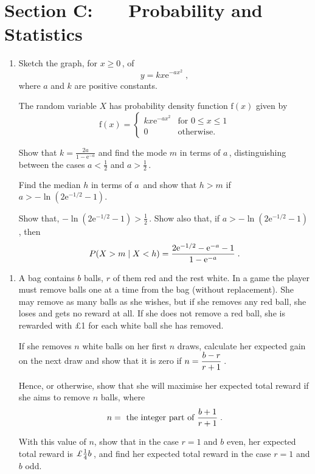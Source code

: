 \documentclass[a4, 11pt]{report}
\newlength{\qspace}
\newcounter{qnumber}
\newenvironment{question}%
 {\vspace{\qspace}
  \begin{enumerate}[\bfseries 1\quad][10]%
    \setcounter{enumi}{\value{qnumber}}%
    \item%
 }
{
  \end{enumerate}
  \filbreak
  \stepcounter{qnumber}
 }
\def\e{{\mathrm e}}
\def\f{{\mathrm f}}
\def\le{\leqslant}
\def\ge{\geqslant}
\newcommand{\ds}{\displaystyle}
\begin{document}
	
	\newpage
\section*{Section C: \ \ \ Probability and Statistics}


\begin{question}
Sketch the graph, for $x \ge 0\,$, of 
$$ 
y = kx\e^{-ax^2} \;,
$$
where $a$ and $k$ are  positive constants.


The random variable $X$ has probability density function
$\f(x)$ given by
\begin{equation*}
\f(x)=
\begin{cases}
kx\e^{-ax^2} & \text{for $0 \le x \le 1$}\\[3pt]
            0 & \text{otherwise}. 
\end{cases}
\end{equation*}

Show that $\ds k=\frac{2a}{1-\e^{-a}}$ and find the mode $m$ in terms of $a\,$,
distinguishing between the cases $a < \frac12$ and $a > \frac12\,$.

Find the median $h$ in terms of $a$\,  and  show that
$h > m$ if
$a > -\ln\left(2\e^{-1/2} - 1\right).$

Show that, $-\ln\left(2\e^{-1/2}-1\right)> \frac12 \,$.
Show also that, 
if $a > -\ln\left(2\e^{-1/2} - 1\right) \,$,  then 
$$
P(X > m \;\vert\; X < h) = 
{{2\e^{-1/2}-\e^{-a}-1} \over 1-\e^{-a}}\;.
$$ 
\end{question}

\begin{question}
A bag contains $b$ balls, $r$ of them red and the rest white. 
In a game the player must remove balls one at a time from the bag (without replacement). 
She may remove  as many balls as she wishes, but if she removes any red
ball, she loses and gets no reward at all.
If she does not remove a red ball,
she is rewarded with \pounds 1 for each white ball she has removed.


If she removes $n$ white balls on her first $n$ draws, calculate her expected 
gain on the next draw and show that 
it is zero 
if $\ds n = {b-r \over r+1}\,$.

Hence, or otherwise, show that she will maximise her expected total
reward if she aims to remove $n$ balls, where 
\[
n = \mbox{ the integer part of } \ds {b + 1 \over r + 1}\;.
\]

With this value of $n$, show that in
the case $r=1$ and $b$ even,
her expected total reward is $\pounds {1 \over 4}b\,$, and find her expected total reward in
the case $r=1$ and $b$ odd.
\end{question}
\end{document}
